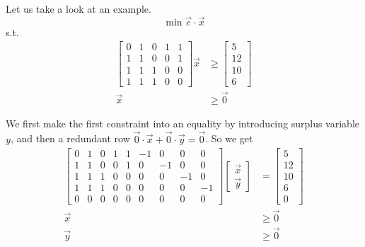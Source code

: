 \documentclass[UTF8,a4paper]{ctexart}
\begin{document}
Let us take a look at an example.
\[
    \min \vec{c}\cdot \vec{x}
\]
s.t.
\begin{align*}
    \begin{bmatrix}
        0&1&0&1&1\\
        1&1&0&0&1\\
        1&1&1&0&0\\
        1&1&1&0&0
    \end{bmatrix}
    \vec{x} &\geq \begin{bmatrix}
        5\\
        12\\
        10\\
        6
    \end{bmatrix}
    \\
    \vec{x}&\geq \vec{0}
\end{align*}

We first make the first constraint into an equality by introducing surplus variable $y$,
and then a redundant row $\vec{0}\cdot \vec{x} + \vec{0}\cdot \vec{y}=\vec{0}$.
So we get
\begin{align*}
    \begin{bmatrix}
        0&1&0&1&1& -1&0&0&0\\
        1&1&0&0&1& 0&-1&0&0\\
        1&1&1&0&0& 0&0&-1&0\\
        1&1&1&0&0& 0&0&0&-1\\
        0&0&0&0&0& 0&0&0&0
    \end{bmatrix}
    \begin{bmatrix}
        \vec{x}\\
        \vec{y}
    \end{bmatrix}
    &=\begin{bmatrix}
        5\\
        12\\
        10\\
        6\\
        0
    \end{bmatrix}
    \\ \vec{x}&\geq \vec{0}
    \\ \vec{y}&\geq \vec{0}
\end{align*}
\end{document}
